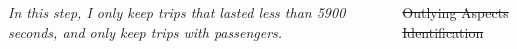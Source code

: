 \documentclass{tikzposter} %
\providecommand{\DIFdeltex}[1]{{\protect\color{red}\sout{#1}}}                      %
\providecommand{\DIFaddend}{} %
\providecommand{\DIFdelbegin}{} %
\providecommand{\DIFdel}[1]{\texorpdfstring{\DIFdeltex{#1}}{}} %
\newcommand{\DIFscaledelfig}{0.5}
\newlength{\DIFdelgraphicswidth} %
\newlength{\DIFdelgraphicsheight} %
\newcommand{\DIFdelincludegraphics}[2][]{%
\sbox{\DIFdelgraphicsbox}{\DIFOincludegraphics[#1]{#2}}%
\settoboxwidth{\DIFdelgraphicswidth}{\DIFdelgraphicsbox} %
\settoboxtotalheight{\DIFdelgraphicsheight}{\DIFdelgraphicsbox} %
\scalebox{\DIFscaledelfig}{%
\parbox[b]{\DIFdelgraphicswidth}{\usebox{\DIFdelgraphicsbox}\\[-\baselineskip] \rule{\DIFdelgraphicswidth}{0em}}\llap{\resizebox{\DIFdelgraphicswidth}{\DIFdelgraphicsheight}{%
\setlength{\unitlength}{\DIFdelgraphicswidth}%
\begin{picture}(1,1)%
\thicklines\linethickness{2pt} %
{\color[rgb]{1,0,0}\put(0,0){\framebox(1,1){}}}%
{\color[rgb]{1,0,0}\put(0,0){\line( 1,1){1}}}%
{\color[rgb]{1,0,0}\put(0,1){\line(1,-1){1}}}%
\end{picture}%
}\hspace*{3pt}}} %
} %
\DeclareRobustCommand{\DIFaddend}{\DIFOaddend \let\includegraphics\DIFOincludegraphics} %
\DeclareRobustCommand{\DIFdelbegin}{\DIFOdelbegin \let\includegraphics\DIFdelincludegraphics} %
\begin{document}
\begin{columns}
{\begin{description}
\vspace{2cm}
  \textit{ {\LARGE  In this step,
    I only keep trips that lasted less than 5900 seconds, and only keep trips with passengers.}}
\end{description}
}
\DIFaddend %



\DIFdelbegin %
\begin{description}%
\item%

\end{description}%


\begin{description}%
\item[\DIFdel{Outlying Aspects Identification}]%


\end{description}
\end{columns}
\end{document}
